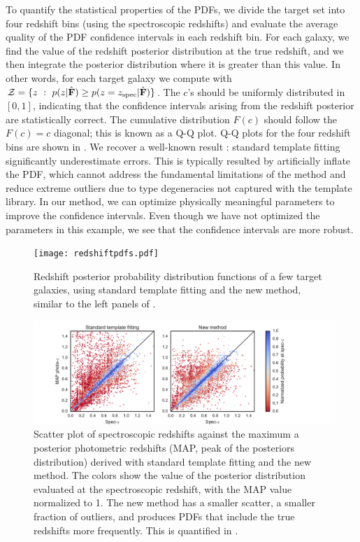 \documentclass[aps,prd,showpacs,superscriptaddress,groupedaddress]{revtex4}  %
\begin{document}
To quantify the statistical properties of the PDFs, we divide the target set into four redshift bins (using the spectroscopic redshifts) and evaluate the average quality of the PDF confidence intervals in each redshift bin.
For each galaxy, we find the value of the redshift posterior distribution at the true redshift, and we then integrate the posterior distribution where it is greater than this value.
In other words, for each target galaxy we compute
with $\mathcal{Z} = \{ z \ : \ p(z | \hat{\mat{F}})  \ge p(z=z_{\mathrm{spec}} | \hat{\mat{F}}) \}$.
The $c$'s should be uniformly distributed in $[0, 1]$, indicating that the confidence intervals arising from the redshift posterior are statistically correct. 
The cumulative distribution $F(c)$ should follow the $F(c)=c$ diagonal; this is known as a Q-Q plot.  
Q-Q plots for the four redshift bins are shown in .
We recover a well-known result \citep[\eg][]{Wittman:2016}: standard template fitting significantly underestimate \photoz errors.
This is typically resulted by artificially inflate the PDF, which cannot address the fundamental limitations of the method and reduce extreme outliers due to type degeneracies not captured with the template library.
In our method, we can optimize physically meaningful parameters to improve the confidence intervals.
Even though we have not optimized the parameters in this example, we see that the confidence intervals are more robust.

\begin{figure}
\texttt{[image: redshiftpdfs.pdf]}
\caption{Redshift posterior probability distribution functions of a few target galaxies, using standard template fitting and the new method, similar to the left panels of .}
\label{fig:redshiftpdfs}
\end{figure}

\begin{figure}
\includegraphics[width=16cm, trim = 1.8cm 0cm 3.5cm 0cm, clip]{zmean_vs_zspec.pdf}
\caption{Scatter plot of spectroscopic redshifts against the maximum a posterior photometric redshifts (MAP, peak of the posteriors distribution) derived with standard template fitting and the new method. 
The colors show the value of the posterior distribution evaluated at the spectroscopic redshift, with the MAP value normalized to 1.
The new method has a smaller scatter, a smaller fraction of outliers, and produces PDFs that include the true redshifts more frequently.
This is quantified in .
}
\label{fig:zmean_vs_zspec}
\end{figure}
\end{document}
